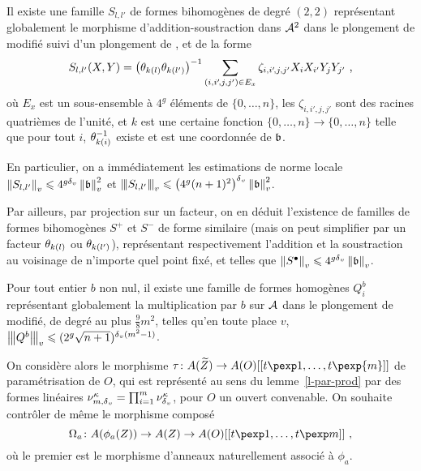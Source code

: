 \begin{fait}
  Il existe une famille $S_{l, l'}$ de formes bihomogènes de degré $(2, 2)$
  représentant globalement le morphisme d'addition-soustraction dans $\mathcal A^2$ dans
  le plongement de  modifié suivi d'un plongement de ,
  et de la forme
  \[
    S_{l, l'}(X, Y) = \big(\theta_{k(l)}\theta_{k(l')}\big)^{-1}
    \sum_{(i, i'\!,j, j') \in E_x}
    \zeta_{i, i'\!, j, j'} X_i X_{i'} Y_j Y_{j'} \text{ ,}
  \]
  où $E_x$ est un sous-ensemble à $4^g$ éléments de $\{0, \ldots, n \}$, les
  $\zeta_{i, i'\!, j, j'}$ sont des racines quatrièmes de l'unité, et $k$ est
  une certaine fonction $\{0, \ldots, n \} \to \{0, \ldots, n \}$ telle que pour
  tout $i$, $\theta_{k(i)}^{-1}$ existe et est une coordonnée de $\mathfrak b$.
\end{fait}

En particulier, on a immédiatement les estimations de norme locale
$\left\lVert\smash{S_{l, l'}}\right\rVert_{v} \leqslant 4^{g{\delta\smash{_v}}} \left\lVert\mathfrak b\right\rVert_{v}^2$ et $\left\lvert\hspace{-1pt}\left\lvert\hspace{-1pt} \left\lvert\smash{S_{l, l'}}\right\rvert \hspace{-1pt}\right\rvert\hspace{-1pt}\right\rvert_{v} \leqslant
\big(4^g (n+1)^2\big)^{\delta\smash{_v}} \left\lVert\mathfrak b\right\rVert_{v}^2$.

Par ailleurs, par projection sur un facteur, on en déduit l'existence de
familles de formes bihomogènes $S^+$ et $S^-$ de forme similaire (mais on peut
simplifier par un facteur $\theta_{k(l)}$ ou $\theta_{k(l')}$), représentant
respectivement l'addition et la soustraction au voisinage de n'importe quel
point fixé, et telles que $\left\lVert S^\bullet\right\rVert_{v} \leqslant 4^{g{\delta\smash{_v}}} \left\lVert\mathfrak b\right\rVert_{v}$.

\begin{fait}
  Pour tout entier $b$ non nul, il existe une famille de formes homogènes
  $Q^b_i$ représentant globalement la multiplication par $b$ sur $\mathcal A$ dans le
  plongement de  modifié, de degré au plus $\frac98 m^2$, telles
  qu'en toute place $v$, $\left\lvert\hspace{-1pt}\left\lvert\hspace{-1pt} \left\lvert Q^b\right\rvert \hspace{-1pt}\right\rvert\hspace{-1pt}\right\rvert_{v} \leqslant (2^g\sqrt{n+1})^{{\delta\smash{_v}}(m^2-1)}$.
\end{fait}

On considère alors le morphisme $\tau \colon A(\widetilde Z) \to
A(O)[[t\pexp1, \ldots, t\pexp{m}]]$ de paramétrisation de $O$, qui est \og
représenté \fg{} au sens du lemme~\ref{l-par-prod} par des formes linéaires
$\nu_{m, {\delta\smash{_v}}}^\kappa = \prod_{i=1}^m \nu_{\delta\smash{_v}}^\kappa$, pour $O$ un ouvert
convenable. On souhaite contrôler de même le morphisme composé
\[
  \Omega_a \colon A(\phi_a(Z)) \to A(Z) \to A(O)[[t\pexp1,
  \ldots, t\pexp m]] \pmm,
\]
où le premier est le morphisme d'anneaux naturellement associé à $\phi_a$.

